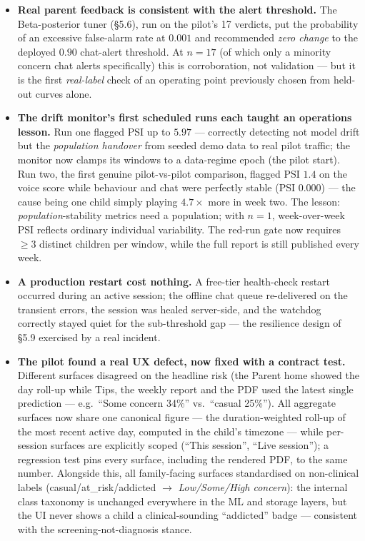 \documentclass[11pt,a4paper]{article}
\begin{document}
\begin{itemize}[leftmargin=1.4em]
        audio, precisely the domain gap \S6.3 states. The channel's capture is sound;
        its labels await child-speech adaptation (future work), and its low ensemble
        weight already prices this in.
  \item \textbf{Real parent feedback is consistent with the alert threshold.} The
        Beta-posterior tuner (\S5.6), run on the pilot's 17 verdicts, put the
        probability of an excessive false-alarm rate at $0.001$ and recommended
        \emph{zero change} to the deployed $0.90$ chat-alert threshold. At $n{=}17$
        (of which only a minority concern chat alerts specifically) this is
        corroboration, not validation --- but it is the first \emph{real-label} check
        of an operating point previously chosen from held-out curves alone.
  \item \textbf{The drift monitor's first scheduled runs each taught an operations
        lesson.} Run one flagged PSI up to $5.97$ --- correctly detecting not model
        drift but the \emph{population handover} from seeded demo data to real pilot
        traffic; the monitor now clamps its windows to a data-regime epoch (the pilot
        start). Run two, the first genuine pilot-vs-pilot comparison, flagged PSI
        $1.4$ on the voice score while behaviour and chat were perfectly stable
        (PSI $0.000$) --- the cause being one child simply playing $4.7\times$ more in
        week two. The lesson: \emph{population}-stability metrics need a population;
        with $n{=}1$, week-over-week PSI reflects ordinary individual variability. The
        red-run gate now requires $\geq 3$ distinct children per window, while the full
        report is still published every week.
  \item \textbf{A production restart cost nothing.} A free-tier health-check restart
        occurred during an active session; the offline chat queue re-delivered on the
        transient errors, the session was healed server-side, and the watchdog
        correctly stayed quiet for the sub-threshold gap --- the resilience design of
        \S5.9 exercised by a real incident.
  \item \textbf{The pilot found a real UX defect, now fixed with a contract test.}
        Different surfaces disagreed on the headline risk (the Parent home showed the
        day roll-up while Tips, the weekly report and the PDF used the latest single
        prediction --- e.g.\ ``Some concern 34\%'' vs.\ ``casual 25\%''). All
        aggregate surfaces now share one canonical figure --- the duration-weighted
        roll-up of the most recent active day, computed in the child's timezone ---
        while per-session surfaces are explicitly scoped (``This session'', ``Live
        session''); a regression test pins every surface, including the rendered PDF,
        to the same number. Alongside this, all family-facing surfaces standardised on
        non-clinical labels (casual/at\_risk/addicted $\rightarrow$ \emph{Low/Some/High
        concern}): the internal class taxonomy is unchanged everywhere in the ML and
        storage layers, but the UI never shows a child a clinical-sounding
        ``addicted'' badge --- consistent with the screening-not-diagnosis stance.
\end{itemize}
\end{document}

